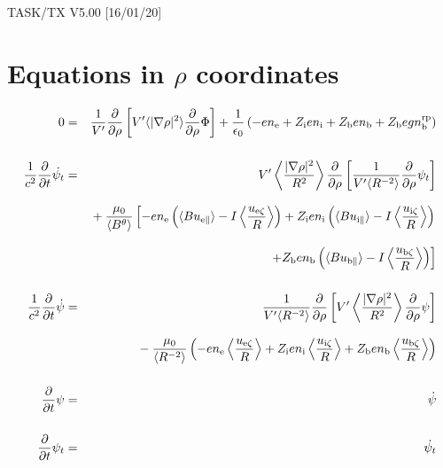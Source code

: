 \documentclass[11pt]{article}
\def\r#1{{\rm#1}}
\def\ave#1{\left\langle#1\right\rangle}
\def\aves#1{\langle#1\rangle}
\def\para{\parallel}
\def\ddrho{\frac{\partial}{\partial\rho}}
\def\gradrho2{\aves{|\nabla\rho|^2}}
\def\psid{\dot{\psi}}
\def\psit{\psi_t}
\def\psitd{\dot{\psit}}
\def\nee{n_\r{e}}
\def\ni{n_\r{i}}
\def\nb{n_\r{b}}
\def\Zi{Z_\r{i}}
\def\Zb{Z_\r{b}}
\def\uezt{u_{\r{e}\zeta}}
\def\uizt{u_{\r{i}\zeta}}
\def\ubzt{u_{\r{b}\zeta}}
\def\uepara{u_{\r{e}\para}}
\def\uipara{u_{\r{i}\para}}
\def\ubpara{u_{\r{b}\para}}
\def\ddt{\frac{\partial}{\partial t}}
\def\nbrp{n_\r{b}^\r{rp}}
\begin{document}
\begin{center}
TASK/TX V5.00 [16/01/20]
\end{center}

\section{Equations in $\rho$ coordinates}
\vspace{-5mm}

%
\begin{eqnarray}
  0 &=&
%
    \frac{1}{V'} \ddrho \left[ V' \gradrho2 \ddrho{\Phi} \right]
%
  + \frac{1}{\epsilon_0}
%
    \left(-e \nee + \Zi e \ni + \Zb e \nb + \Zb e g \nbrp \right)
\\[5mm]
  \frac{1}{c^2} \ddt \psitd &=&
%
    V' \ave{\frac{|\nabla\rho|^2}{R^2}} \ddrho \left[ \frac{1}{V'\aves{R^{-2}}}
				         \ddrho \psit \right] \nonumber\\[3mm]&&{}
%
  + \frac{\mu_0}{\aves{B^\theta}}
%
    \left[-     e \nee \left( \aves{B\uepara} - I\ave{\frac{\uezt}{R}} \right)
          + \Zi e \ni  \left( \aves{B\uipara} - I\ave{\frac{\uizt}{R}} \right)
    \right.\nonumber\\[3mm]&&{}
    \left.+ \Zb e \nb  \left( \aves{B\ubpara} - I\ave{\frac{\ubzt}{R}} \right) \right]
\\[5mm]
  \frac{1}{c^2} \ddt \psid &=&
%
  \frac{1}{V'\aves{R^{-2}}} \ddrho \left[ V'
				    \ave{\frac{|\nabla\rho|^2}{R^2}}
				    \ddrho \psi \right] \nonumber\\[3mm]&&{}
%
  - \frac{\mu_0}{\aves{R^{-2}}} \left(-e \nee \ave{\frac{\uezt}{R}} +
				 \Zi e \ni \ave{\frac{\uizt}{R}} + \Zb e
				 \nb \ave{\frac{\ubzt}{R}} \right)
%
\\[5mm]
  \ddt \psi &=&
%
  \psid
\\[5mm]
  \ddt \psit &=&
%
  \psitd
\end{eqnarray}
%

\end{document}
